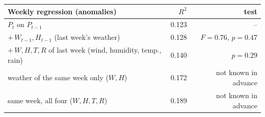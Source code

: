 \begin{tabular}{|l|r|r|}
\hline
\textbf{Weekly regression (anomalies)} & \textbf{$R^2$} & \textbf{test} \\\hline
$P_t$ on $P_{t-1}$ & 0.123 & -- \\\hline
$+\,W_{t-1},H_{t-1}$ (last week's weather) & 0.128 & $F=0.76$, $p=0.47$ \\\hline
$+\,W,H,T,R$ of last week (wind, humidity, temp., rain) & 0.140 & $p=0.29$ \\\hline
weather of the same week only ($W,H$) & 0.172 & not known in advance \\\hline
same week, all four ($W,H,T,R$) & 0.189 & not known in advance \\\hline
\end{tabular}
